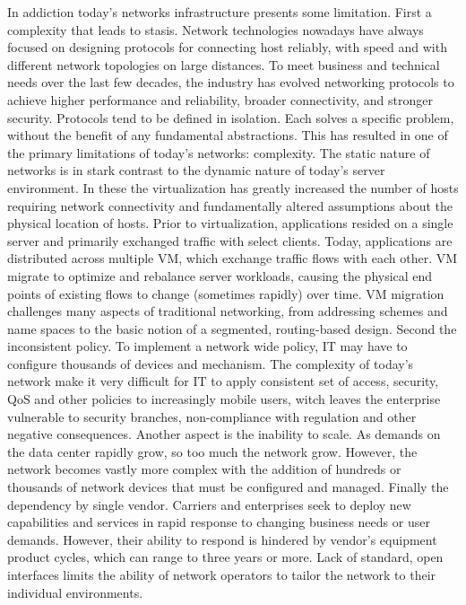 In addiction today's networks infrastructure presents some limitation. First a complexity that leads to stasis. Network technologies nowadays have always focused on designing protocols for connecting host reliably, with speed and with different network topologies on large distances. To meet business and technical needs over the last few decades, the industry has evolved networking protocols to achieve higher performance and reliability, broader connectivity, and stronger security. Protocols tend to be defined in isolation. Each solves a specific problem, without the benefit of any fundamental abstractions. This has resulted in one of the primary limitations of today's networks: complexity. The static nature of networks is in stark contrast to the dynamic nature of today's server environment. In these the virtualization has greatly increased the number of hosts requiring network connectivity and fundamentally altered assumptions about the physical location of hosts. Prior to virtualization, applications resided on a single server and primarily exchanged traffic with select clients. Today, applications are distributed across multiple \ac{VM}, which exchange traffic flows with each other. \ac{VM} migrate to optimize and rebalance server workloads, causing the physical end points of existing flows to change (sometimes rapidly) over time. \ac{VM} migration challenges many aspects of traditional networking, from addressing schemes and name spaces to the basic notion of a segmented, routing-based design. Second the inconsistent policy. To implement a network wide policy, \ac{IT} may have to configure thousands of devices and mechanism. The complexity of today's network make it very difficult for \ac{IT} to apply consistent set of access, security, \ac{QoS} and other policies to increasingly mobile users, witch leaves the enterprise vulnerable to security branches, non-compliance with regulation and other negative consequences. Another aspect is the inability to scale. As demands on the data center rapidly grow, so too much the network grow. However, the network becomes vastly more complex with the addition of hundreds or thousands of network devices that must be configured and managed. Finally the dependency by single vendor. Carriers and enterprises seek to deploy new capabilities and services in rapid response to changing business needs or user demands. However, their ability to respond is hindered by vendor's equipment product cycles, which can range to three years or more. Lack of standard, open interfaces limits the ability of network operators to tailor the network to their individual environments. \cite{onf:sdn-description-limitations}

